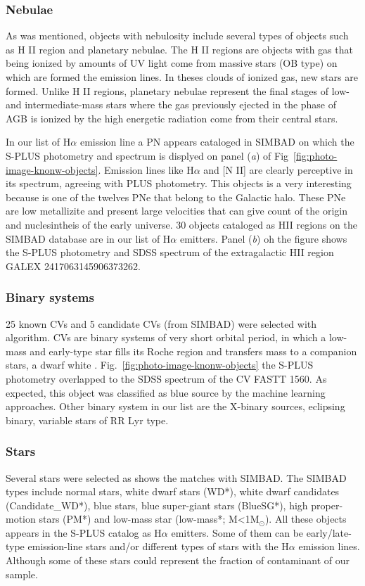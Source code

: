 \documentclass[fleqn,usenatbib]{mnras}
\begin{document}
\subsubsection{Nebulae}

As was mentioned, objects with nebulosity include several
types of objects such as H II region and planetary nebulae.
The H II regions are objects with gas that being ionized by
amounts of UV light come from massive stars (OB type) on which
are formed the emission lines. In theses clouds of ionized gas,
new stars are formed. Unlike H II regions, planetary nebulae
represent the final stages of low- and intermediate-mass stars
where the gas previously ejected in the phase of AGB is ionized
by the high energetic radiation come from their central stars.

In our list of H{$\alpha$} emission line a PN appears cataloged in SIMBAD 
on which the S-PLUS photometry and spectrum is displyed on panel (\textit{a}) 
of Fig~\ref{fig:photo-image-knonw-objects}. Emission lines like H{$\alpha$} 
and [N II] are clearly perceptive in its spectrum, agreeing with PLUS photometry.
This objects is a very interesting because is one of the twelves PNe that belong
to the Galactic halo. These PNe are low metallizite and present large velocities that
can give count of the origin and nuclesintheis of the early universe. 30 objects 
cataloged as HII regions on the SIMBAD database are in our list of H{$\alpha$} emitters. 
Panel (\textit{b}) oh the figure shows the S-PLUS photometry and SDSS spectrum 
of the extragalactic HII region GALEX 2417063145906373262.   

\subsubsection{Binary systems}
25 known CVs and 5 candidate CVs (from SIMBAD) were selected with algorithm.
CVs are binary systems of very short orbital period, in which a low-mass and
early-type star fills its Roche region and transfers mass to a companion stars,
a dwarf white \citep{Patterson:1984}. Fig.~\ref{fig:photo-image-knonw-objects} the S-PLUS
photometry overlapped to the SDSS spectrum of the CV FASTT 1560. As expected,
this object was classified as blue source by the machine learning approaches.
Other binary system in our list are the X-binary sources, eclipsing binary, variable
stars of RR Lyr type. 

\subsubsection{Stars}
Several stars were selected as shows the matches with SIMBAD.
The SIMBAD types include normal stars, white dwarf stars (WD*), white dwarf
candidates (Candidate\_WD*), blue stars, blue super-giant stars (BlueSG*), high
proper-motion stars (PM*) and low-mass star (low-mass*; M<1M$_\odot$). All these
objects appears in the S-PLUS catalog as H{$\alpha$} emitters. Some of them 
can be early/late-type emission-line stars and/or different types of stars with
the H{$\alpha$} emission lines. Although some of these stars could represent the 
fraction of contaminant of our sample.
\end{document}
